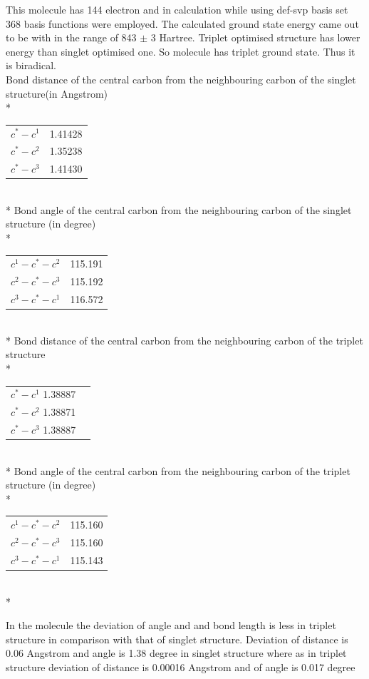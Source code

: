 \documentclass{article}
\begin{document}
\linebreak
This molecule has 144 electron and in calculation while using def-svp basis set 368 basis functions were employed. The calculated ground state energy came out to be with in the range of 843 \( \pm \) 3 Hartree. Triplet optimised structure has lower energy than singlet optimised one. So molecule has triplet ground state. Thus it is biradical.\\ 
Bond distance of the central carbon from the neighbouring carbon of the singlet structure(in Angstrom)\\*
\begin{tabular}{c c}
\(c^{*}-c^{1}\) & 1.41428 \\
\(c^{*}-c^{2}\) & 1.35238 \\
\(c^{*}-c^{3}\) & 1.41430 \\
\end{tabular}\\*
Bond angle of the central carbon from the neighbouring carbon of the singlet structure (in degree)\\*
\begin{tabular}{c c}
\(c^{1}-c^{*}-c^{2}\) & 115.191\\
\(c^{2}-c^{*}-c^{3}\) & 115.192\\
\(c^{3}-c^{*}-c^{1}\) & 116.572\\
\end{tabular}\\*
Bond distance of the central carbon from the neighbouring carbon of the triplet structure\\*
\begin{tabular}{c c}
\(c^{*}-c^{1}\) 1.38887 \\
\(c^{*}-c^{2}\) 1.38871 \\
\(c^{*}-c^{3}\) 1.38887 \\
\end{tabular}\\*
Bond angle of the central carbon from the neighbouring carbon of the triplet structure (in degree)\\*
\begin{tabular}{c c}
\(c^{1}-c^{*}-c^{2}\) & 115.160 \\
\(c^{2}-c^{*}-c^{3}\) & 115.160 \\
\(c^{3}-c^{*}-c^{1}\) & 115.143 \\
\end{tabular}\\*

In the molecule the deviation of angle and and bond length is less in triplet structure in comparison with that of singlet structure.
Deviation of distance is 0.06 Angstrom and angle is 1.38 degree in singlet structure where as in triplet structure deviation of distance is 0.00016 Angstrom and of angle is 0.017 degree

\pagebreak
\end{document}
